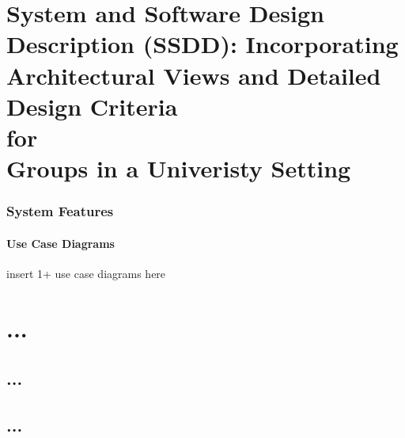 \documentclass[12pt, oneside, letterpaper]{report}
\begin{document}
\part{System and Software Design Description (SSDD): Incorporating
     Architectural Views and Detailed Design Criteria \\ for \\ Groups in a
     Univeristy Setting}
\tableofcontents                                %
\listoffigures
\listoftables



\nopagebreak




\pagebreak
\section{System Features}
	\subsection{Use Case Diagrams}                insert 1+ use case diagrams here
        


\part{...}
\appendix                                      %
\chapter{...}
\chapter{...}
\end{document}
